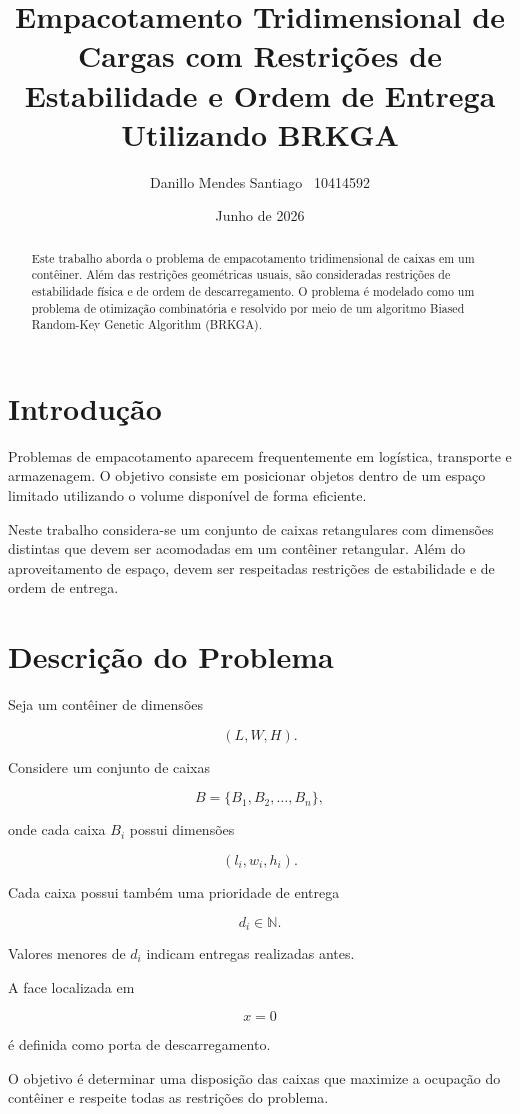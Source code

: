 \documentclass[12pt]{article}
\title{Empacotamento Tridimensional de Cargas com Restrições de Estabilidade e Ordem de Entrega Utilizando BRKGA}
\author{Danillo Mendes Santiago \ 10414592}
\date{Junho de 2026}
\begin{document}
\maketitle

\begin{abstract}
Este trabalho aborda o problema de empacotamento tridimensional de caixas em um contêiner. Além das restrições geométricas usuais, são consideradas restrições de estabilidade física e de ordem de descarregamento. O problema é modelado como um problema de otimização combinatória e resolvido por meio de um algoritmo Biased Random-Key Genetic Algorithm (BRKGA).
\end{abstract}

\section{Introdução}

Problemas de empacotamento aparecem frequentemente em logística, transporte e armazenagem. O objetivo consiste em posicionar objetos dentro de um espaço limitado utilizando o volume disponível de forma eficiente.

Neste trabalho considera-se um conjunto de caixas retangulares com dimensões distintas que devem ser acomodadas em um contêiner retangular. Além do aproveitamento de espaço, devem ser respeitadas restrições de estabilidade e de ordem de entrega.

\section{Descrição do Problema}

Seja um contêiner de dimensões

\[
(L,W,H).
\]

Considere um conjunto de caixas

\[
B=\{B_1,B_2,\ldots,B_n\},
\]

onde cada caixa $B_i$ possui dimensões

\[
(l_i,w_i,h_i).
\]

Cada caixa possui também uma prioridade de entrega

\[
d_i \in \mathbb{N}.
\]

Valores menores de $d_i$ indicam entregas realizadas antes.

A face localizada em

\[
x=0
\]

é definida como porta de descarregamento.

O objetivo é determinar uma disposição das caixas que maximize a ocupação do contêiner e respeite todas as restrições do problema.
\end{document}
